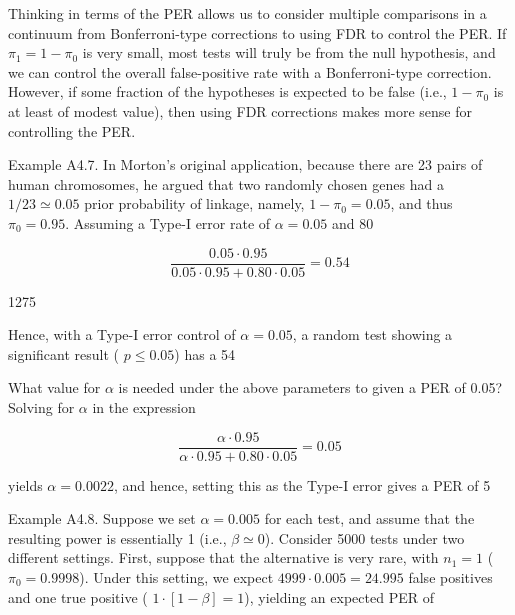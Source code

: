 \documentclass{article}
\begin{document}
Thinking in terms of the PER allows us to consider multiple comparisons in a continuum from Bonferroni-type corrections to using FDR to control the PER. If  $ \pi_1 = 1 - \pi_0 $ is very small, most tests will truly be from the null hypothesis, and we can control the overall false-positive rate with a Bonferroni-type correction. However, if some fraction of the hypotheses is expected to be false (i.e.,  $ 1 - \pi_0 $ is at least of modest value), then using FDR corrections makes more sense for controlling the PER.

Example A4.7. In Morton's original application, because there are 23 pairs of human chromosomes, he argued that two randomly chosen genes had a  $ 1/23 \simeq 0.05 $ prior probability of linkage, namely,  $ 1 - \pi_0 = 0.05 $, and thus  $ \pi_0 = 0.95 $. Assuming a Type-I error rate of  $ \alpha = 0.05 $ and 80%

\begin{equation}
\frac{0.05\cdot0.95}{0.05\cdot0.95+0.80\cdot0.05}=0.54
\end{equation}

1275

Hence, with a Type-I error control of  $ \alpha = 0.05 $, a random test showing a significant result ( $ p \leq 0.05 $) has a 54%

What value for  $ \alpha $ is needed under the above parameters to given a PER of 0.05? Solving for  $ \alpha $ in the expression

\begin{equation}
\frac{\alpha\cdot0.95}{\alpha\cdot0.95+0.80\cdot0.05}=0.05
\end{equation}

yields  $ \alpha = 0.0022 $, and hence, setting this as the Type-I error gives a PER of 5%

Example A4.8. Suppose we set  $ \alpha = 0.005 $ for each test, and assume that the resulting power is essentially 1 (i.e.,  $ \beta \simeq 0 $). Consider 5000 tests under two different settings. First, suppose that the alternative is very rare, with  $ n_1 = 1 $ ( $ \pi_0 = 0.9998 $). Under this setting, we expect  $ 4999 \cdot 0.005 = 24.995 $ false positives and one true positive ( $ 1 \cdot [1 - \beta] = 1 $), yielding an expected PER of
\end{document}
